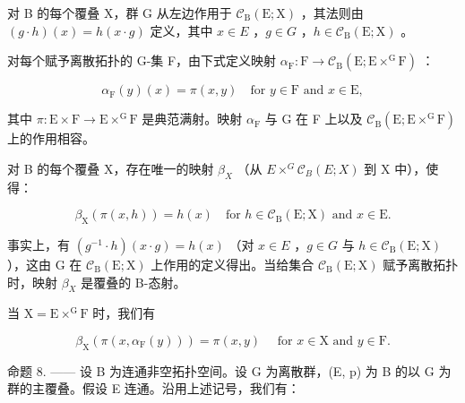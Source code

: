 对 B 的每个覆叠 X，群 G 从左边作用于 \(\mathcal{C}_{\mathrm{B}}(\mathrm{E};\mathrm{X})\) ，其法则由 \((g\cdot h)(x)=h(x\cdot g)\) 定义，其中 \(x\in E\) ，\(g\in G\) ，\(h\in\mathcal{C}_{\mathrm{B}}(\mathrm{E};\mathrm{X})\) 。

对每个赋予离散拓扑的 G-集 F，由下式定义映射 \(\alpha_{\mathrm{F}}\colon \mathrm{F}\to \mathcal{C}_{\mathrm{B}}(\mathrm{E};\mathrm{E}\times^{\mathrm{G}}\mathrm{F})\) ：

\[
\alpha_ {\mathrm{F}} (y) (x) = \pi (x, y) \quad \text {for } y \in \mathrm{F} \text { and } x \in \mathrm{E},\tag{2}
\]

其中 \(\pi\colon\mathrm{E}\times\mathrm{F}\to\mathrm{E}\times^{\mathrm{G}}\mathrm{F}\) 是典范满射。映射 \(\alpha_{\mathrm{F}}\) 与 G 在 F 上以及 \(\mathcal{C}_{\mathrm{B}}(\mathrm{E};\mathrm{E}\times^{\mathrm{G}}\mathrm{F})\) 上的作用相容。

对 B 的每个覆叠 X，存在唯一的映射 \(\beta_{X}\) （从 \(E \times^{G} \mathcal{C}_{B}(E; X)\) 到 X 中），使得：

\[
\beta_ {\mathrm{X}} (\pi (x, h)) = h (x) \quad \text {for } h \in \mathcal {C} _ {\mathrm{B}} (\mathrm{E}; \mathrm{X}) \text { and } x \in \mathrm{E}.\tag{3}
\]

事实上，有 \((g^{-1}\cdot h)(x\cdot g)=h(x)\) （对 \(x\in E\) ，\(g\in G\) 与 \(h\in\mathcal{C}_{\mathrm{B}}(\mathrm{E};\mathrm{X})\) ），这由 G 在 \(\mathcal{C}_{\mathrm{B}}(\mathrm{E};\mathrm{X})\) 上作用的定义得出。当给集合 \(\mathcal{C}_{\mathrm{B}}(\mathrm{E};\mathrm{X})\) 赋予离散拓扑时，映射 \(\beta_{X}\) 是覆叠的 B-态射。

当 \(\mathrm{X} = \mathrm{E}\times^{\mathrm{G}}\mathrm{F}\) 时，我们有

\[
\beta_ {\mathrm{X}} \left(\pi \left(x, \alpha_ {\mathrm{F}} (y)\right)\right) = \pi (x, y) \quad \text {   for   } x \in \mathrm{X} \text {   and   } y \in \mathrm{F}.\tag{4}
\]

命题 8. —— 设 B 为连通非空拓扑空间。设 G 为离散群，(E, p) 为 B 的以 G 为群的主覆叠。假设 E 连通。沿用上述记号，我们有：

